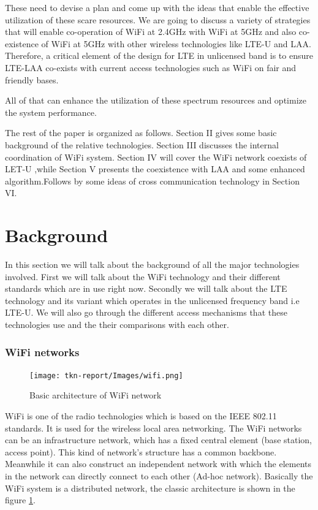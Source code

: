 \documentclass{IEEEtran}
\begin{document}
These need to devise a plan and come up with the ideas that enable the effective utilization of these scare resources. We are going to discuss a variety of strategies that will enable co-operation of WiFi at 2.4GHz with WiFi at 5GHz and also co-existence of WiFi at 5GHz with other wireless technologies like LTE-U and LAA. Therefore, a critical element of the design for LTE in unlicensed band is to ensure LTE-LAA co-exists with current access technologies such as WiFi on fair and friendly bases.


All of that can enhance the utilization of these spectrum resources and optimize the system performance.

The rest of the paper is organized as follows. Section II gives some basic background of the relative technologies. Section III discusses the internal coordination of WiFi system. Section IV will cover the WiFi network coexists of LET-U ,while Section V presents the coexistence with LAA and some enhanced algorithm.Follows by some ideas of cross communication technology in Section VI.

\section{Background}
In this section we will talk about the background of all the major technologies involved. First we will talk about the WiFi technology and their different standards which are in use right now. Secondly we will talk about the LTE technology and its variant which operates in the unlicensed frequency band i.e LTE-U. We will also go through the different access mechanisms that these technologies use and the their comparisons with each other.

\subsubsection{WiFi networks}

\graphicspath{{Images/}}
\maketitle
\begin{figure}[htp]
\centering
\texttt{[image: tkn-report/Images/wifi.png]}
\caption{Basic architecture of WiFi network}
\label{wifi-architecture}
\end{figure}

WiFi is one of the radio technologies which is based on the IEEE 802.11 standards. It is used for the wireless local area networking. The WiFi networks can be an infrastructure network, which has a fixed central element (base station, access point). This kind of network’s structure has a common backbone. Meanwhile it can also construct an independent network with which the elements in the network can directly connect to each other (Ad-hoc network). Basically the WiFi system is a distributed network, the classic architecture is shown in the figure \ref{wifi-architecture}.
\end{document}
